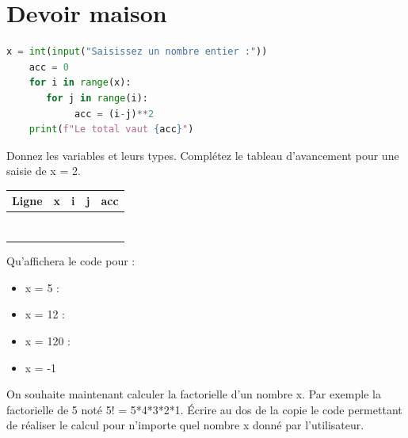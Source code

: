 \section*{Devoir maison}

\begin{Exercise}[title={Boucles imbriquées}]

\begin{lstlisting}[style=pythonstyle, language=python]
    x = int(input("Saisissez un nombre entier :"))
    acc = 0
    for i in range(x):
       for j in range(i):
            acc = (i-j)**2
    print(f"Le total vaut {acc}")
\end{lstlisting}

\Question Donnez les variables et leurs types.
\Question Complétez le tableau d'avancement pour une saisie de x = 2.\\
\begin{center}
    \large
\begin{tabular}{c|c|c|c|c|}
\textbf{Ligne} & \textbf{x} & \textbf{i} & \textbf{j} & \textbf{acc}  \\
\hline
 & &  &  & \\
 & &  &  & \\
 & &  &  & \\
  & &  &  & \\
   & &  &  & \\
    & &  &  & \\
     & &  &  & \\
\end{tabular}
\end{center}

\begin{center}
\end{center}


\Question Qu'affichera le code pour :
\begin{itemize}
    \item x = 5 :\\
    \item x = 12 :\\
    \item x = 120 :\\
    \item x = -1\\
\end{itemize}
\end{Exercise}
\begin{Exercise}[title={La factorielle}]
\Question On souhaite maintenant calculer la factorielle d'un nombre x. Par exemple la factorielle de 5 noté 5! = 5*4*3*2*1. Écrire au dos de la copie le code permettant de réaliser le calcul pour n'importe quel nombre x donné par l'utilisateur.
\end{Exercise}
